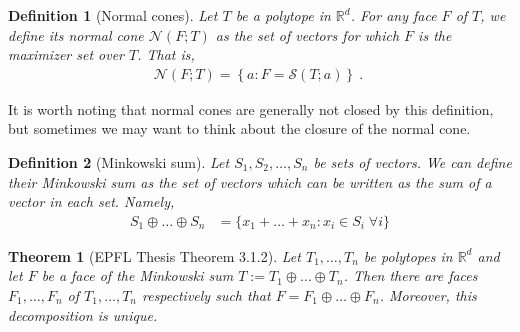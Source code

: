 \documentclass[12pt]{article}
\newcommand{\reals}{\mathbb{R}}
\newcommand{\N}{\mathcal{N}}
\newtheorem{theorem}{Theorem}
\newtheorem{definition}{Definition}
\newtheorem{corollary}{Corollary}
\begin{document}
\begin{definition}[Normal cones]
  Let $T$ be a polytope in $\reals^d$.
  For any face $F$ of $T$, we define its \emph{normal cone} $\N(F;T)$ as the set of vectors for which $F$ is the maximizer set over $T$.
  That is,
  \begin{align*}
    \N(F;T) = \left\{a : F = \mathcal{S}(T; a) \right\}~.~
  \end{align*}
\end{definition}

  It is worth noting that normal cones are generally not closed by this definition, but sometimes we may want to think about the closure of the normal cone.
\fi

\begin{definition}[Minkowski sum]
	Let $S_1, S_2, \ldots, S_n$ be sets of vectors.
	We can define their \emph{Minkowski sum} as the set of vectors which can be written as the sum of a vector in each set.
	Namely,
	\begin{align*}
	S_1 \oplus \ldots \oplus S_n &= \{x_1 + \ldots + x_n : x_i \in S_i \; \forall i \}
	\end{align*}
\end{definition}

\begin{theorem}[EPFL Thesis Theorem 3.1.2]\label{thm:unique-face-decomp}
	Let $T_1, \ldots, T_n$ be polytopes in $\reals^d$ and let $F$ be a face of the Minkowski sum $T := T_1 \oplus \ldots \oplus T_n$.
	Then there are faces $F_1, \ldots, F_n$ of $T_1, \ldots, T_n$ respectively such that $F = F_1 \oplus \ldots \oplus F_n$.
	Moreover, this decomposition is unique.
\end{theorem}

\iffalse 
\begin{corollary}[EPFL Cor 3.1.3]\label{cor:face-decomp-normal-cones}
  Let $T = T_1 \oplus \ldots \oplus T_n$ be a Minkowski sum of polytopes in $\reals^d$, let $F$ be a nonempty face of $T$ , and let $F_1, \ldots, F_n$ be its decomposition.
  Then $\N(F;T) = \N(F_1;T_1) \cap \ldots \cap \N(F_n; T_n)$.
\end{corollary}

\begin{corollary}[EPFL Cor 3.1.4]
  Let $F_1, \ldots, F_n$ be nonempty faces of the polytopes $T_1, \ldots, T_n$ respectively, then $F_1 \oplus \ldots \oplus F_n$ is a face of $T_1 \oplus \ldots \oplus T_n$ if and only if the intersection of their normal cones is nonempty.
\end{corollary}
\fi
\end{document}

